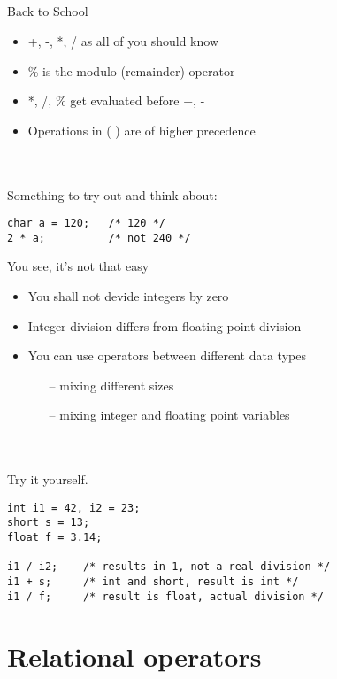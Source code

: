 \subsection{}
\begin{frame}[fragile]{Back to School}
	\begin{itemize}
		\item +, -, *, / as all of you should know
		\item \% is the modulo (remainder) operator
		\item *, /, \% get evaluated before +, -
		\item Operations in (  ) are of higher precedence
	\end{itemize}
	\ \\\ \\Something to try out and think about:
	\begin{lstlisting}[numbers=none]
char a = 120;	/* 120 */
2 * a;			/* not 240 */
\end{lstlisting}
\end{frame}
\begin{frame}[fragile]{You see, it's not that easy}
	\begin{itemize}
		\item You shall not devide integers by zero
		\item Integer division differs from floating point division
		\item You can use operators between different data types
		\begin{itemize}
			\item[--] mixing different sizes
			\item[--] mixing integer and floating point variables
		\end{itemize}
	\end{itemize}
	\ \\\ \\Try it yourself.
	\begin{lstlisting}[numbers=none]
int i1 = 42, i2 = 23;
short s = 13;
float f = 3.14;

i1 / i2;	/* results in 1, not a real division */
i1 + s;		/* int and short, result is int */
i1 / f;		/* result is float, actual division */
\end{lstlisting}
\end{frame}
\section{Relational operators}
